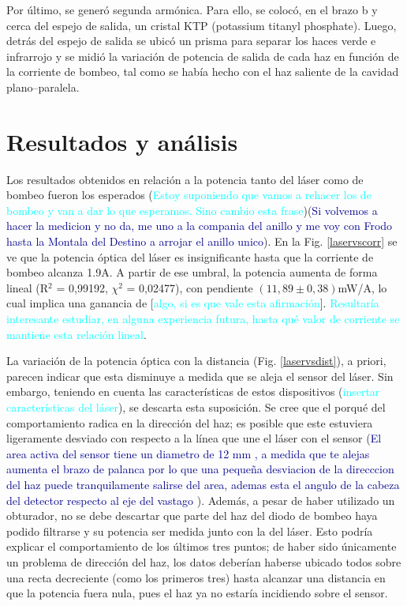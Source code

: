 \documentclass[10pt, a4paper]{article}%
\begin{document}
\begin{multicols}{2}
Por último, se generó segunda armónica. Para ello, se colocó, en el brazo b y cerca del espejo de salida, un cristal KTP (potassium titanyl phosphate). Luego, detrás del espejo de salida se ubicó un prisma para separar los haces verde e infrarrojo y se midió la variación de potencia de salida de cada haz en función de la corriente de bombeo, tal como se había hecho con el haz saliente de la cavidad plano--paralela.   



\section{Resultados y análisis}

Los resultados obtenidos en relación a la potencia tanto del láser como de bombeo fueron los esperados (\textcolor{cyan}{Estoy suponiendo que vamos a rehacer los de bombeo y van a dar lo que esperamos. Sino cambio esta frase})({\textcolor{DarkBlue}{Si volvemos a hacer la medicion y no da, me uno a la compania del anillo y me voy con Frodo hasta la Montala del Destino a arrojar el anillo unico}}). En la Fig. \ref{laservscorr} se ve que la potencia óptica del láser es insignificante hasta que la corriente de bombeo alcanza 1.9A. A partir de ese umbral, la potencia aumenta de forma lineal  (R$^2$ = 0,99192, $\chi^2$ = 0,02477), con pendiente $ (11,89 \pm 0,38)$mW/A, lo cual implica una ganancia de [\textcolor{cyan}{algo, si es que vale esta afirmación}]. \textcolor{cyan}{Resultaría interesante estudiar, en alguna experiencia futura, hasta qué valor de corriente se mantiene esta relación lineal}. 

La variación de la potencia óptica con la distancia (Fig. \ref{laservsdist}), a priori, parecen indicar que esta disminuye a medida que se aleja el sensor del láser. Sin embargo, teniendo en cuenta las características de estos dispositivos (\textcolor{cyan}{insertar características del láser}), se descarta esta suposición. Se cree que el porqué del comportamiento radica en la dirección del haz; es posible que este estuviera ligeramente desviado con respecto a la línea que une el láser con el sensor (\textcolor{DarkBlue}{El area activa del sensor tiene un diametro de 12 mm , a medida que te alejas aumenta el brazo de palanca por lo que una pequeña desviacion de la direcccion del haz puede tranquilamente salirse del area, ademas esta el angulo de la cabeza del detector respecto al eje del vastago }). Además, a pesar de haber utilizado un obturador, no se debe descartar que parte del haz del diodo de bombeo haya podido filtrarse y su potencia ser medida junto con la del láser. Esto podría explicar el comportamiento de los últimos tres puntos; de haber sido únicamente un problema de dirección del haz, los datos deberían haberse ubicado todos sobre una recta decreciente (como los primeros tres) hasta alcanzar una distancia en que la potencia fuera nula, pues el haz ya no estaría incidiendo sobre el sensor. 


\end{multicols}
\end{document}
